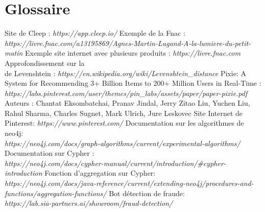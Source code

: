 \documentclass{article} %
\begin{document}
\newpage

\section{Glossaire}
\begin{thebibliography}{9}
	Site de Cleep : \textit{https://app.cleep.io/}
	Exemple de la Fnac : \textit{https://livre.fnac.com/a13195869/Agnes-Martin-Lugand-A-la-lumiere-du-petit-matin}
	Exemple site internet avec plusieurs produits : \textit{https://livre.fnac.com}
	Approfondissement sur la \\
	 de Levenshtein : \textit{https://en.wikipedia.org/wiki/Levenshtein\_distance}
	Pixie: A System for Recommending 3+ Billion Items to 200+ Million Users in Real-Time :
	\textit{https://labs.pinterest.com/user/themes/pin\_labs/assets/paper/paper-pixie.pdf}\\
	Auteurs : Chantat Eksombatchai, Pranav Jindal, Jerry Zitao Liu, Yuchen Liu,
	Rahul Sharma, Charles Sugnet, Mark Ulrich, Jure Leskovec
	Site Internet de Pinterest: \textit{https://www.pinterest.com/}
	Documentation sur les algorithmes de neo4j: \\ \textit{https://neo4j.com/docs/graph-algorithms/current/experimental-algorithms/}
	Documentation sur Cypher :\\
	\textit{https://neo4j.com/docs/cypher-manual/current/introduction/\#cypher-introduction}
	Fonction d'aggregation sur Cypher:\\
	\textit{https://neo4j.com/docs/java-reference/current/extending-neo4j/procedures-and-functions/aggregation-functions/}
	Bot détection de fraude:\\
	\textit{https://lab.sia-partners.ai/showroom/fraud-detection/}
	
\end{thebibliography}
\newpage






\imtaMakeCover
\end{document}
